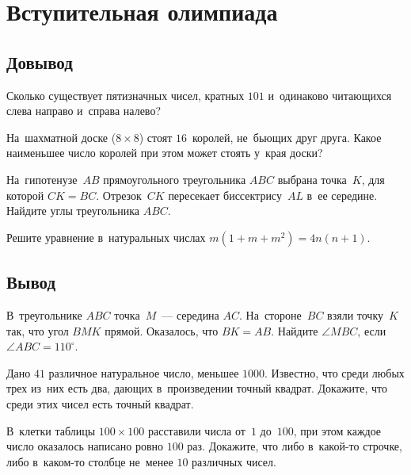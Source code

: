 
\section*{Вступительная олимпиада}

\subsection*{Довывод}

\begin{problems}

\item
Сколько существует пятизначных чисел, кратных $101$ и~одинаково читающихся
слева направо и~справа налево?

\item
На~шахматной доске ($8 \times 8$) стоят $16$~королей, не~бьющих друг друга.
Какое наименьшее число королей при этом может стоять у~края доски?

\item
На~гипотенузе~$AB$ прямоугольного треугольника $ABC$ выбрана точка~$K$, для
которой $CK = BC$.
Отрезок~$CK$ пересекает биссектрису~$AL$ в~ее середине.
Найдите углы треугольника $ABC$.

\item
Решите уравнение в~натуральных числах $m (1 + m + m^2) = 4 n (n + 1)$.

\end{problems}

\subsection*{Вывод}

\begin{problems}

\item
В~треугольнике $ABC$ точка~$M$~--- середина $AC$.
На~стороне~$BC$ взяли точку~$K$ так, что угол $BMK$ прямой.
Оказалось, что $BK = AB$.
Найдите $\angle MBC$, если $\angle ABC = 110^{\circ}$.

\item
Дано $41$ различное натуральное число, меньшее $1000$.
Известно, что среди любых трех из~них есть два, дающих в~произведении точный
квадрат.
Докажите, что среди этих чисел есть точный квадрат.

\item
В~клетки таблицы $100 \times 100$ расставили числа от~$1$ до~$100$, при этом
каждое число оказалось написано ровно $100$ раз.
Докажите, что либо в~какой-то строчке, либо в~каком-то столбце не~менее
$10$ различных чисел.

\end{problems}

